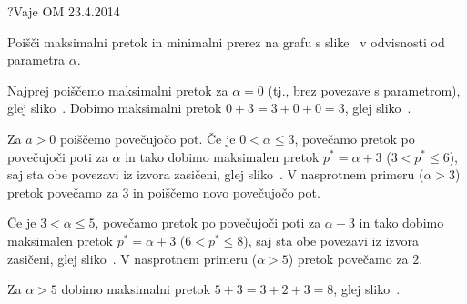\begin{naloga}{?}{Vaje OM 23.4.2014}
\begin{vprasanje}
Poišči maksimalni pretok in minimalni prerez na grafu s slike~\fig
v odvisnosti od parametra $\alpha$.

\begin{slika}
\pgfslika
{}
\end{slika}
\end{vprasanje}

\begin{odgovor}
Najprej poiščemo maksimalni pretok za $\alpha = 0$
(tj., brez povezave s parametrom), glej sliko~.
Dobimo maksimalni pretok $0+3 = 3+0+0 = 3$, glej sliko~.

Za $a > 0$ poiščemo povečujočo pot.
Če je $0 < \alpha \le 3$,
povečamo pretok po povečujoči poti za $\alpha$
in tako dobimo maksimalen pretok $p^* = \alpha+3$ ($3 < p^* \le 6$),
saj sta obe povezavi iz izvora zasičeni, glej sliko~.
V nasprotnem primeru ($\alpha > 3$) pretok povečamo za $3$
in poiščemo novo povečujočo pot.

Če je $3 < \alpha \le 5$, povečamo pretok po povečujoči poti za $\alpha-3$
in tako dobimo maksimalen pretok $p^* = \alpha+3$ ($6 < p^* \le 8$),
saj sta obe povezavi iz izvora zasičeni, glej sliko~.
V nasprotnem primeru ($\alpha > 5$) pretok povečamo za $2$.

Za $\alpha > 5$ dobimo maksimalni pretok $5+3 = 3+2+3 = 8$,
glej sliko~.

\begin{slika}
\end{slika}
\begin{slika}
\end{slika}
\begin{slika}
\end{slika}
\begin{slika}
\end{slika}
\begin{slika}
\end{slika}
\end{odgovor}
\end{naloga}
